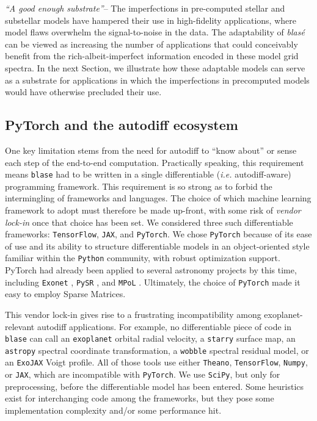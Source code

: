 \documentclass[twocolumn]{aastex631}
\begin{document}
\emph{``A good enough substrate''}-- The imperfections in pre-computed stellar and substellar models have hampered their use in high-fidelity applications, where model flaws overwhelm the signal-to-noise in the data.  The adaptability of  \emph{blas\'e} can be viewed as increasing the number of applications that could conceivably benefit from the rich-albeit-imperfect information encoded in these model grid spectra.  In the next Section, we illustrate how these adaptable models can serve as a substrate for applications in which the imperfections in precomputed models would have otherwise precluded their use.

\subsection{PyTorch and the autodiff ecosystem}

One key limitation stems from the need for autodiff to ``know about'' or sense each step of the end-to-end computation.  Practically speaking, this requirement means \texttt{blase} had to be written in a single differentiable (\emph{i.e.} autodiff-aware) programming framework.  This requirement is so strong as to forbid the intermingling of frameworks and languages.  The choice of which machine learning framework to adopt must therefore be made up-front, with some risk of \emph{vendor lock-in} once that choice has been set.  We considered three such differentiable frameworks: \texttt{TensorFlow}, \texttt{JAX}, and \texttt{PyTorch}.  We chose \texttt{PyTorch} because of its ease of use and its ability to structure differentiable models in an object-oriented style familiar within the \texttt{Python} community, with robust optimization support.  PyTorch had already been applied to several astronomy projects by this time, including \texttt{Exonet} \citep{2018ApJ...869L...7A}, \texttt{PySR} \citep{pysr}, and \texttt{MPoL} \citep{mpol}.  Ultimately, the choice of \texttt{PyTorch} made it easy to employ Sparse Matrices.

This vendor lock-in gives rise to a frustrating incompatibility among exoplanet-relevant autodiff applications.  For example, no differentiable piece of code in \texttt{blase} can call an \texttt{exoplanet} orbital radial velocity, a \texttt{starry} surface map, an \texttt{astropy} spectral coordinate transformation, a \texttt{wobble} spectral residual model, or an \texttt{ExoJAX} Voigt profile.  All of those tools use either \texttt{Theano}, \texttt{TensorFlow}, \texttt{Numpy}, or \texttt{JAX}, which are incompatible with \texttt{PyTorch}.  We use \texttt{SciPy}, but only for preprocessing, before the differentiable model has been entered.  Some heuristics exist for interchanging code among the frameworks, but they pose some implementation complexity and/or some performance hit.
\end{document}
